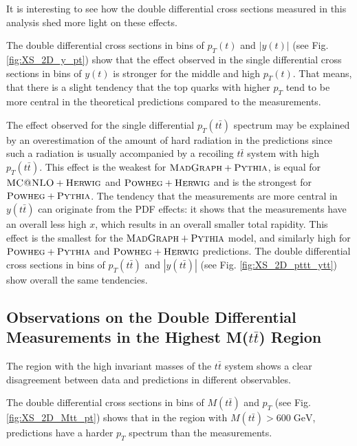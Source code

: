 It is interesting to see how the double differential cross sections measured in this analysis shed more light on these effects.

The double differential cross sections in bins of $p_{T}(t)$ and $|y(t)|$ (see Fig. \ref{fig:XS_2D_y_pt}) show that the effect observed in
the single differential cross sections in bins of $y(t)$ is stronger for the middle and high $p_{T}(t)$. That means, that there is a slight 
tendency that the top quarks with higher $p_{T}$ tend to be more central in the theoretical predictions compared to the measurements.

The effect observed for the single differential $p_{T}(t\bar{t})$ spectrum may be explained by an overestimation of the amount of hard radiation
in the predictions since such a radiation is usually accompanied by a recoiling $t\bar{t}$ system with high $p_{T}(t\bar{t})$. This effect is the weakest 
for $\textsc{MadGraph}+\textsc{Pythia}$, is equal for $\textsc{MC@NLO}+\textsc{Herwig}$ and $\textsc{Powheg}+\textsc{Herwig}$ and is the strongest for
$\textsc{Powheg}+\textsc{Pythia}$. The tendency that the measurements are more central in $y(t\bar{t})$ can originate from the PDF effects: it shows that the 
measurements have an overall less high $x$, which results in an overall smaller total rapidity. 
This effect is the smallest for the $\textsc{MadGraph}+\textsc{Pythia}$ model, and similarly high for $\textsc{Powheg}+\textsc{Pythia}$ and
$\textsc{Powheg}+\textsc{Herwig}$ predictions. The double differential cross sections in bins of $p_{T}(t\bar{t})$ and $|y(t\bar{t})|$ (see Fig. \ref{fig:XS_2D_pttt_ytt}) 
show overall the same tendencies. 

\subsection{Observations on the Double Differential Measurements in the Highest M($t\bar{t}$) Region}\label{sec:ddxsec_discuss}

The region with the high invariant masses of the $t\bar{t}$ system shows a clear disagreement between data and predictions in different observables.

The double differential cross sections in bins of $M(t\bar{t})$ and $p_{T}$ (see Fig. \ref{fig:XS_2D_Mtt_pt}) shows that in the region with 
$M(t\bar{t}) > 600\;\text{GeV}$, predictions have a harder $p_{T}$ spectrum than the measurements. 

